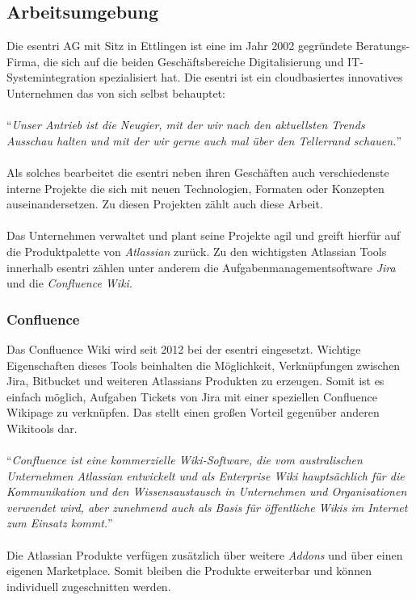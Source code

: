 \documentclass[a4paper,12pt,twoside]{scrartcl}
\begin{document}
\subsection{Arbeitsumgebung}
Die esentri AG mit Sitz in Ettlingen ist eine im Jahr 2002 gegründete Beratungs-Firma, die sich auf die beiden Geschäftsbereiche Digitalisierung und IT-Systemintegration spezialisiert hat. Die esentri ist ein cloudbasiertes innovatives Unternehmen das von sich selbst behauptet:
\\\\
\enquote{\textit{Unser Antrieb ist die Neugier, mit der wir nach den aktuellsten Trends Ausschau halten und mit der wir gerne auch mal über den Tellerrand schauen.}} \footnotemark
{}
\\\\
Als solches bearbeitet die esentri neben ihren Geschäften auch verschiedenste interne Projekte die sich mit neuen Technologien, Formaten oder Konzepten auseinandersetzen. Zu diesen Projekten zählt auch diese Arbeit. 
\\\\
Das Unternehmen verwaltet und plant seine Projekte agil und greift hierfür auf die Produktpalette von \textit{Atlassian} zurück. Zu den wichtigsten Atlassian Tools innerhalb esentri zählen unter anderem die Aufgabenmanagementsoftware \textit{Jira} und die \textit{Confluence Wiki}.

\subsubsection{Confluence}
Das Confluence Wiki wird seit 2012 bei der esentri eingesetzt. Wichtige Eigenschaften dieses Tools beinhalten die Möglichkeit, Verknüpfungen zwischen Jira, Bitbucket und weiteren Atlassians Produkten zu erzeugen. Somit ist es einfach möglich, Aufgaben Tickets von Jira mit einer speziellen Confluence Wikipage zu verknüpfen. Das stellt einen großen Vorteil gegenüber anderen Wikitools dar.
\\\\
\enquote{\textit{Confluence ist eine kommerzielle Wiki-Software, die vom australischen Unternehmen Atlassian entwickelt und als Enterprise Wiki hauptsächlich für die Kommunikation und den Wissensaustausch in Unternehmen und Organisationen verwendet wird, aber zunehmend auch als Basis für öffentliche Wikis im Internet zum Einsatz kommt.}} \footnotemark
{}
\\\\
Die Atlassian Produkte verfügen zusätzlich über weitere \textit{Addons} und über einen eigenen Marketplace. Somit bleiben die Produkte erweiterbar und können individuell zugeschnitten werden.
\end{document}
